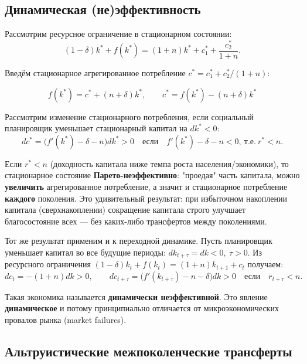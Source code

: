 \documentclass[10pt,a4paper]{article}
\begin{document}
\subsection{Динамическая (не)эффективность}

Рассмотрим ресурсное ограничение в стационарном состоянии:
$$(1-\delta)k^{*} + f(k^{*}) = (1+n)k^{*} + c_1^{*} + \frac{c_2^{*}}{1+n}.$$

Введём стационарное агрегированное потребление $c^{*} = c_1^{*} + c_2^{*}/(1+n)$:
\begin{formulabox}
\begin{equation}
f(k^{*}) = c^{*} + (n+\delta)k^{*}, \qquad c^{*} = f(k^{*}) - (n+\delta)k^{*} \tag{4.23}
\end{equation}
\end{formulabox}

Рассмотрим изменение стационарного потребления, если социальный планировщик уменьшает стационарный капитал на $dk^{*} < 0$:
$$dc^{*} = \big(f'(k^{*}) - \delta - n\big)dk^{*} > 0 \quad \text{если} \quad f'(k^{*}) - \delta - n < 0,\ \text{т.е.}\ r^{*} < n.$$

\begin{intuition}
Если $r^{*} < n$ (доходность капитала ниже темпа роста населения/экономики), то стационарное состояние \textbf{Парето-неэффективно}: "проедая" часть капитала, можно \textbf{увеличить} агрегированное потребление, а значит и стационарное потребление \textbf{каждого} поколения. Это удивительный результат: при избыточном накоплении капитала (сверхнакоплении) сокращение капитала строго улучшает благосостояние всех — без каких-либо трансфертов между поколениями.
\end{intuition}

Тот же результат применим и к переходной динамике. Пусть планировщик уменьшает капитал во все будущие периоды: $dk_{t+\tau} = dk < 0,\ \tau>0$. Из ресурсного ограничения $(1-\delta)k_t+f(k_t)=(1+n)k_{t+1}+c_t$ получаем:
$$dc_t = -(1+n)dk > 0, \qquad dc_{t+\tau} = \big(f'(k_{t+\tau}) - n - \delta\big)dk > 0 \quad \text{если} \quad r_{t+\tau} < n.$$

Такая экономика называется \textbf{динамически неэффективной}. Это явление \textbf{динамическое} и потому принципиально отличается от микроэкономических провалов рынка (market failures).

\subsection{Альтруистические межпоколенческие трансферты}
\end{document}
